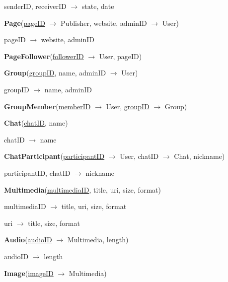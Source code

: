 \documentclass[12pt]{report}
\begin{document}
senderID, receiverID $\rightarrow$ state, date

\vspace{2mm}

\textbf{Page}(\underline{pageID} $\rightarrow$ Publisher, website, adminID $\rightarrow$ User)

pageID $\rightarrow$ website, adminID

\vspace{2mm}

\textbf{PageFollower}(\underline{followerID} $\rightarrow$ User, pageID)

\vspace{2mm}

\textbf{Group}(\underline{groupID}, name, adminID $\rightarrow$ User)

groupID $\rightarrow$ name, adminID

\vspace{2mm}

\textbf{GroupMember}(\underline{memberID} $\rightarrow$ User, \underline{groupID} $\rightarrow$ Group)

\vspace{2mm}

\textbf{Chat}(\underline{chatID}, name)

chatID $\rightarrow$ name

\vspace{2mm}

\textbf{ChatParticipant}(\underline{participantID} $\rightarrow$ User, chatID $\rightarrow$ Chat, nickname)

participantID, chatID $\rightarrow$ nickname

\vspace{2mm}

\textbf{Multimedia}(\underline{multimediaID}, title, uri, size, format)

multimediaID $\rightarrow$ title, uri, size, format  

uri $\rightarrow$ title, size, format

\vspace{2mm}

\textbf{Audio}(\underline{audioID} $\rightarrow$ Multimedia, length)

audioID $\rightarrow$ length

\vspace{2mm}

\textbf{Image}(\underline{imageID} $\rightarrow$ Multimedia)

\vspace{2mm}
\end{document}
